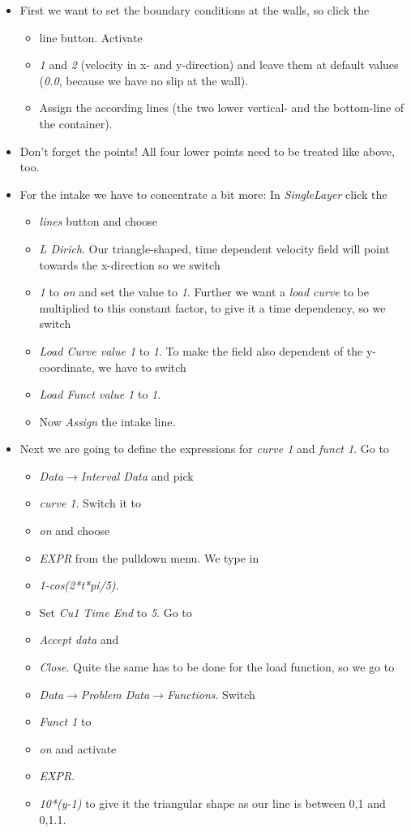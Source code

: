 \begin{itemize}
\item First we want to set the boundary conditions at the walls, so click the

\begin{itemize}
\item line button. Activate 
\item \emph{1} and \emph{2} (velocity in x- and y-direction) and leave them
at default values (\emph{0.0}, because we have no slip at the wall).
\item Assign the according lines (the two lower vertical- and the bottom-line
of the container). 
\end{itemize}
\item Don't forget the points! All four lower points need to be treated
like above, too.
\item For the intake we have to concentrate a bit more: In \emph{SingleLayer}
click the

\begin{itemize}
\item \emph{lines} button and choose 
\item \emph{L Dirich}. Our triangle-shaped, time dependent velocity field
will point towards the x-direction so we switch 
\item \emph{1} to \emph{on} and set the value to \emph{1}. Further we want
a \emph{load curve} to be multiplied to this constant factor, to give
it a time dependency, so we switch 
\item \emph{Load Curve value 1} to \emph{1}. To make the field also dependent
of the y-coordinate, we have to switch 
\item \emph{Load Funct value 1} to \emph{1}. 
\item Now \emph{Assign} the intake line.
\end{itemize}
\item Next we are going to define the expressions for \emph{curve 1} and
\emph{funct 1}. Go to 

\begin{itemize}
\item \emph{Data$\to$Interval Data} and pick
\item \emph{curve 1}. Switch it to 
\item \emph{on} and choose 
\item \emph{EXPR} from the pulldown menu. We type in 
\item \emph{1-cos(2{*}t{*}pi/5)}. 
\item Set \emph{Cu1 Time End} to \emph{5}. Go to 
\item \emph{Accept data} and 
\item \emph{Close}. Quite the same has to be done for the load function,
so we go to 
\item \emph{Data$\to$Problem Data$\to$Functions}. Switch 
\item \emph{Funct 1} to 
\item \emph{on} and activate 
\item \emph{EXPR}. 
\item \emph{10{*}(y-1)} to give it the triangular shape as our line is between
0,1 and 0,1.1. 
\end{itemize}
\end{itemize}
